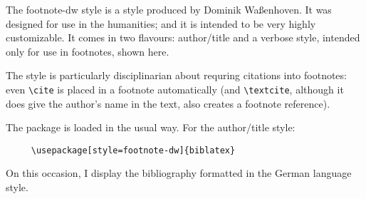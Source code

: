 
\usepackage[style=german]{csquotes}
\usepackage[german,english]{babel}
\usepackage[style=footnote-dw,backend=biber]{biblatex}


\renewcommand{\showingstyle}{dw-footnote}


The \textsf{footnote-dw} style is a style produced by Dominik Waßenhoven. It was designed for use in the humanities; and it is intended to be very highly customizable. It comes in two flavours: author/title and a verbose style, intended only for use in footnotes, shown here.

The style is particularly disciplinarian about requring citations into footnotes: even \verb~\cite~ is placed in a footnote automatically (and \verb~\textcite~, although it does give the author's name in the text, also creates a footnote reference).

\quad The package is loaded in the usual way. For the author/title style:
\begin{verbatim}
     \usepackage[style=footnote-dw]{biblatex}
\end{verbatim}

On this occasion, I display the bibliography formatted in the German language style.





